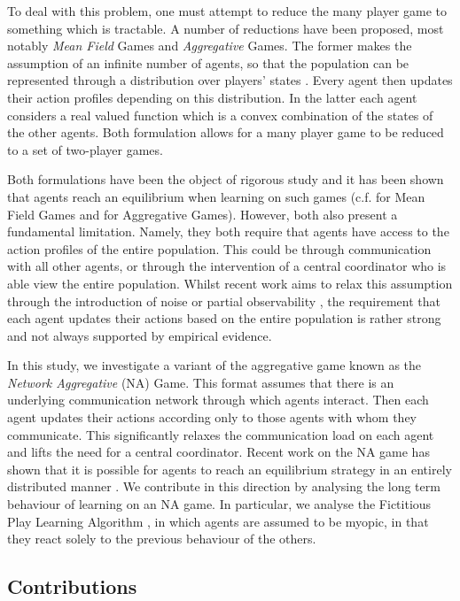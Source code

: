 \documentclass{article}
\theoremstyle{definition}
\begin{document}
To deal with this problem, one must attempt to reduce the many player game to something which is
tractable. A number of reductions have been proposed, most notably \emph{Mean Field} Games
and \emph{Aggregative} Games. The former makes the assumption of an infinite
number of agents, so that the population can be represented through a distribution over players'
states \cite{CainesPaper} . Every agent then updates their action profiles depending on this
distribution. In the latter each agent considers a real valued function which is a convex
combination of the states of the other agents. Both formulation allows for a many player game to be reduced to a set of two-player games.

Both formulations have been the object of rigorous study and it has been shown that agents reach an equilibrium when learning on such games (c.f. \cite{MFGLearningPapers} for Mean Field Games and
\cite{Aggregative Papers} for Aggregative Games). However, both also present a fundamental limitation.
Namely, they both require that agents have access to the action profiles of the entire population.
This could be through communication with all other agents, or through the intervention of a central
coordinator who is able view the entire population. Whilst recent work aims to relax this assumption
through the introduction of noise \cite{MFG-FP} or partial observability \cite{AAMASPaper}, the
requirement that each agent updates their actions based on the entire population is rather strong and not always supported by empirical evidence.

In this study, we investigate a variant of the aggregative game known as the \emph{Network
Aggregative} (NA) Game. This format assumes that there is an underlying communication network
through which agents interact. Then each agent updates their actions according only to those agents
with whom they communicate. This significantly relaxes the communication load on each agent and
lifts the need for a central coordinator. Recent work on the NA game has shown that it is possible
for agents to reach an equilibrium strategy in an entirely distributed manner \cite{Grammatico,
LeaderFollower, MyopicAgents}. We contribute in this direction by analysing the long term behaviour of learning on an NA game. In particular, we analyse the Fictitious Play Learning
Algorithm \cite{Brown, Harris}, in which agents are assumed to be myopic, in that they react solely
to the previous behaviour of the others.


\subsection{Contributions}
\end{document}
